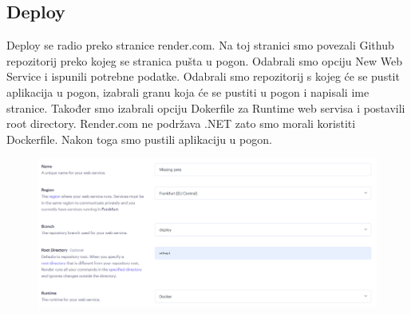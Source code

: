 			\subsection{Deploy}
				Deploy se radio preko stranice render.com. Na toj stranici smo povezali Github repozitorij preko kojeg se stranica pušta u pogon. Odabrali smo opciju New Web Service i ispunili potrebne podatke. Odabrali smo repozitorij s kojeg će se pustit aplikacija u pogon, izabrali granu koja će se pustiti u pogon i napisali ime stranice. Također smo izabrali opciju Dokerfile za Runtime web servisa i postavili root directory. Render.com ne podržava .NET zato smo morali koristiti Dockerfile. Nakon toga smo pustili aplikaciju u pogon.
				\begin{figure}[H]
					\includegraphics[width=\textwidth]{pp2.PNG}
					\centering
					\label{fig:pp2}
				\end{figure}
			
		
			
			
			
			
			\eject 